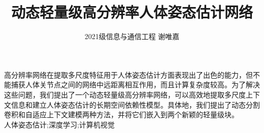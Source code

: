 \documentclass[hyperref]{ctexart}
\title{\textbf{动态轻量级高分辨率人体姿态估计网络}}
\author{2021级\quad 信息与通信工程 \quad 谢唯嘉 \quad 6120210299}
\date{}
\begin{document}
	\maketitle
	\renewcommand\tablename{表}
	高分辨率网络在提取多尺度特征用于人体姿态估计方面表现出了出色的能力，但不能捕获人体关节点之间的网络中远距离相互作用，而且计算复杂度较高。为了解决这些问题，我们提出了一个动态轻量级高分辨率网络，可以高效地提取多尺度上下文信息和建立人体姿态估计的长期空间依赖性模型。具体地，我们提出了动态分割卷积和自适应上下文建模两种方法，并将它们嵌入到两个新颖的轻量级块。\\
	
	人体姿态估计;深度学习;计算机视觉
\end{document}
